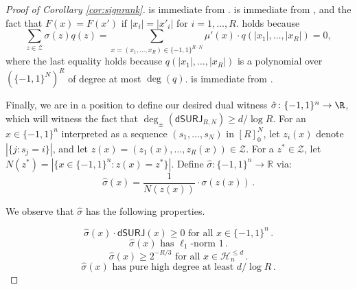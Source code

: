 \documentclass{toc}
\newcommand{\dumSURJ}{\mathsf{dSURJ}}
\newcommand{\bits}{\{-1,1\}}
\begin{document}
\begin{proof}[Proof of Corollary \ref{cor:signrank}]
 is immediate from . 
 is immediate from  , and the fact that $F(x)=F(x')$ if $|x_i|=|x'_i|$ for $i=1, \dots, R$. 
 holds because
$$\sum_{z \in \mathcal{Z}} \sigma(z) q(z) = \sum_{x=(x_1, \dots, x_R) \in \bits^{R \cdot N}} \mu'(x) \cdot q(|x_1|, \dots, |x_R|)
= 0,$$ 
where the last equality holds because $q(|x_1|, \dots, |x_R|)$ is a polynomial over $\left(\bits^{N}\right)^R$ of degree at most $\deg(q)$. 
 is immediate from . 

Finally, we are in a position to define our desired
dual witness $\hat{\sigma} \colon \bits^n \to \R$,
which will witness the fact that $\deg_{\pm}(\dumSURJ_{R, N}) \geq d/\log R$. 
For an $x \in \bits^n$ interpreted as a sequence $(s_1, \dots, s_N)$ in $[R]_0^N$, let $z_i(x)$ denote $\left| \{j \colon s_j=i\}\right|$,
and let $z(x)=(z_1(x), \dots, z_R(x)) \in \mathcal{Z}$. For a $z^* \in \mathcal{Z}$, let $N(z^*) = |\{x \in \bits^n \colon z(x)=z^*\}|$. 
Define $\hat{\sigma} \colon \bits^n \to \mathbb{R}$ via: 
%
\begin{equation} \label{hatsigmadef} \hat{\sigma}(x) = \frac{1}{N(z(x))} \cdot \sigma(z(x))\,.\end{equation}

%
We observe that $\hat{\sigma}$ has the following properties. %

\begin{equation} \label{mysouliscrushedhat}
\hat{\sigma}(x) \cdot \dumSURJ(x) \geq 0 \text{ for all } x \in \bits^n\,.
\end{equation}
\begin{equation} \label{brrr}
\hat{\sigma}(x) \text{ has } \ell_1\text{-norm } 1\,.
\end{equation}
\begin{equation} \label{zrp}
\hat{\sigma}(x) \geq 2^{-R/3} \text{ for all } x \in \mathcal{H}^{\leq d}_{n}\,.
\end{equation}
\begin{equation} \label{phdsigmasighhat}
\hat{\sigma}(x) \text{ has pure high degree at least } d/\log R\,.
\end{equation}


\end{proof}
\end{document}
